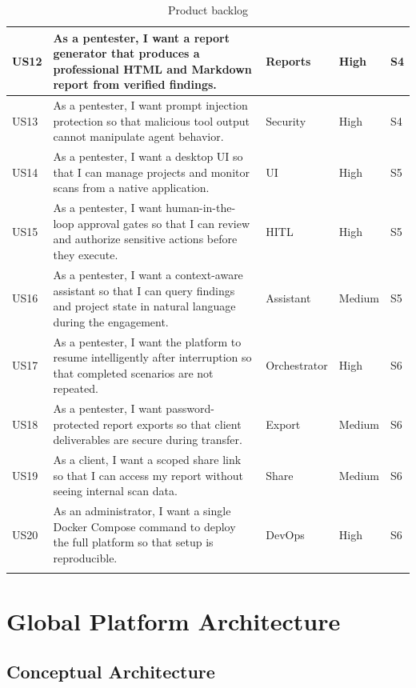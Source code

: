 \documentclass[12pt,a4paper]{report}
\begin{document}
\begin{longtable}{|p{}|p{}|p{}|p{}|p{}|}
\hline
US12 & As a pentester, I want a report generator that produces a professional HTML
and Markdown report from verified findings. & Reports & High & S4 \\
\hline
US13 & As a pentester, I want prompt injection protection so that malicious tool
output cannot manipulate agent behavior. & Security & High & S4 \\
\hline
US14 & As a pentester, I want a desktop UI so that I can manage projects and monitor
scans from a native application. & UI & High & S5 \\
\hline
US15 & As a pentester, I want human-in-the-loop approval gates so that I can review
and authorize sensitive actions before they execute. & HITL & High & S5 \\
\hline
US16 & As a pentester, I want a context-aware assistant so that I can query findings
and project state in natural language during the engagement. & Assistant & Medium & S5 \\
\hline
US17 & As a pentester, I want the platform to resume intelligently after interruption
so that completed scenarios are not repeated. & Orchestrator & High & S6 \\
\hline
US18 & As a pentester, I want password-protected report exports so that client
deliverables are secure during transfer. & Export & Medium & S6 \\
\hline
US19 & As a client, I want a scoped share link so that I can access my report
without seeing internal scan data. & Share & Medium & S6 \\
\hline
US20 & As an administrator, I want a single Docker Compose command to deploy the
full platform so that setup is reproducible. & DevOps & High & S6 \\
\hline
\caption{Product backlog}
\label{tab:product_backlog}
\end{longtable}

\section{Global Platform Architecture}

\subsection{Conceptual Architecture}
\end{document}
